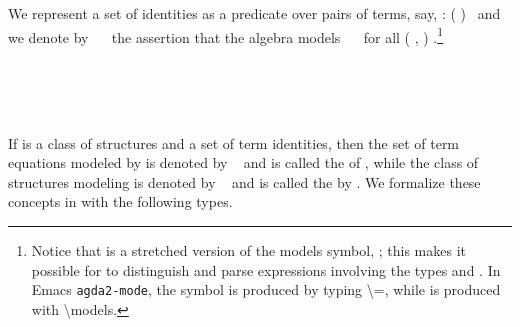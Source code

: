 We represent a set of identities as a predicate over pairs of
terms, say,  : (    )~\au{}  and we denote by
~~ the assertion that the algebra  models ~~
for all ( , )  .\footnote{Notice that  is
a stretched version of the models symbol, ;
\ifshort\else
this makes it possible for \agda to distinguish and parse expressions involving the types
 and .
\fi
In Emacs \texttt{agda2-mode}, the symbol  is produced by typing
\textbackslash\textbar{}=, while  is
produced with \textbackslash{}models.}

\begin{code}%
\>[0]\<%
\\
\>[0][@{}l@{\AgdaIndent{1}}]%
\>[1]\AgdaSpace{}%
\AgdaSymbol{:}\AgdaSpace{}%
\AgdaSymbol{(}\AgdaSpace{}%
\AgdaSymbol{:}\AgdaSpace{}%
\AgdaSpace{}%
\AgdaSpace{}%
\AgdaSymbol{)}\AgdaSpace{}%
\AgdaSpace{}%
\AgdaSymbol{(}\AgdaSpace{}%
\AgdaSpace{}%
\AgdaSpace{}%
\AgdaSpace{}%
\AgdaSymbol{)(}\AgdaSpace{}%
\AgdaSymbol{)}\AgdaSpace{}%
\AgdaSpace{}%
\AgdaSpace{}%
\AgdaSymbol{\AgdaUnderscore{}}\<%
\\
%
\>[1]\AgdaSpace{}%
\AgdaSpace{}%
\AgdaSpace{}%
\AgdaSymbol{=}\AgdaSpace{}%
\AgdaSpace{}%
\AgdaSymbol{\{}\AgdaSpace{}%
\AgdaSymbol{\}}\AgdaSpace{}%
\AgdaSpace{}%
\AgdaSymbol{(}\AgdaSpace{}%
\AgdaOperator{\AgdaInductiveConstructor{,}}\AgdaSpace{}%
\AgdaSymbol{)}\AgdaSpace{}%
\AgdaSpace{}%
\AgdaSpace{}%
\AgdaSpace{}%
\AgdaSpace{}%
\AgdaSpace{}%
\AgdaSpace{}%
\AgdaSpace{}%
\AgdaSpace{}%
\AgdaSpace{}%
\<%
\\
\>[0]\<%
\end{code}

If  is a class of structures and  a set of term identities, then the set of
term equations modeled by  is denoted by ~ and is called the
 of , while the class of structures modeling  is
denoted by ~ and is called the  by
. We formalize these concepts in \agda with the following types.

